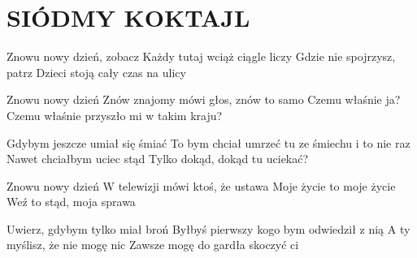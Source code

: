 \documentclass[../../../songbook.tex]{subfiles}
\begin{document}
\TabPositions{9cm} %
\section*{SIÓDMY KOKTAJL}
{}
\vspace{0.5cm}
Znowu nowy dzień, zobacz		 \newline	 
Każdy tutaj wciąż ciągle liczy		 \newline	
Gdzie nie spojrzysz, patrz		 \newline	
Dzieci stoją cały czas na ulicy		 \newline	

Znowu nowy dzień		 \newline	
Znów znajomy mówi głos, znów to samo		 \newline	
Czemu właśnie ja?		 \newline	
Czemu właśnie przyszło mi w takim kraju?		 \newline	

\-\hspace{1cm} Gdybym jeszcze umiał się śmiać						 \newline	
\-\hspace{1cm} To bym chciał umrzeć tu ze śmiechu i to nie raz		 \newline
\-\hspace{1cm} Nawet chciałbym uciec stąd							 \newline
\-\hspace{1cm} Tylko dokąd, dokąd tu uciekać?						 \newline

Znowu nowy dzień		 \newline	
W telewizji mówi ktoś, że ustawa		 \newline	
Moje życie to moje życie		 \newline	
Weź to stąd, moja sprawa		 \newline	

\-\hspace{1cm} Uwierz, gdybym tylko miał broń		 \newline	
\-\hspace{1cm} Byłbyś pierwszy kogo bym odwiedził z nią		 \newline	
\-\hspace{1cm} A ty myślisz, że nie mogę nic		 \newline	
\-\hspace{1cm} Zawsze mogę do gardła skoczyć ci		 \newline	
\end{document}
